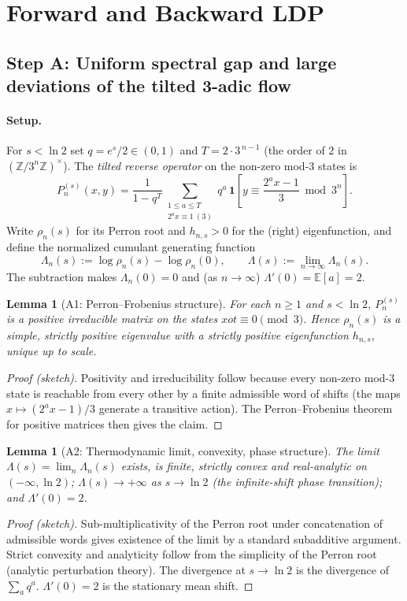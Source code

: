 \documentclass[12pt,a4paper]{article}
\newtheorem{lemma}[theorem]{Lemma}
\theoremstyle{remark}
\begin{document}
\section{Forward and Backward LDP}
\subsection{Step A: Uniform spectral gap and large deviations of the tilted 3-adic flow}
\label{subsec:step_a}
\paragraph{Setup.} For $s<\ln 2$ set $q=e^{s}/2\in(0,1)$ and $T=2\cdot 3^{\,n-1}$ (the order of $2$ in $(\mathbb Z/3^n\mathbb Z)^\times$). The \emph{tilted reverse operator} on the non-zero mod-$3$ states is
\[
P_n^{(s)}(x,y)=\frac{1}{1-q^{T}}\sum_{\substack{1\le a\le T\\ 2^{a}x\equiv1\ (3)}} q^{a}\,
\mathbf 1\!\left[y\equiv\frac{2^{a}x-1}{3}\bmod 3^{n}\right].
\]
Write $\rho_n(s)$ for its Perron root and $h_{n,s}>0$ for the (right) eigenfunction, and define the normalized cumulant generating function
\[
\Lambda_n(s):=\log\rho_n(s)-\log\rho_n(0),\qquad \Lambda(s):=\lim_{n\to\infty}\Lambda_n(s).
\]
The subtraction makes $\Lambda_n(0)=0$ and (as $n\to\infty$) $\Lambda'(0)=\mathbb E[a]=2$.
\begin{lemma}[A1: Perron--Frobenius structure]
For each $n\ge1$ and $s<\ln2$, $P_n^{(s)}$ is a positive irreducible matrix on the states $x
ot\equiv0\pmod3$. Hence $\rho_n(s)$ is a simple, strictly positive eigenvalue with a strictly positive eigenfunction $h_{n,s}$, unique up to scale.
\end{lemma}
\begin{proof}[Proof (sketch)]
Positivity and irreducibility follow because every non-zero mod-$3$ state is reachable from every other by a finite admissible word of shifts (the maps $x\mapsto(2^ax-1)/3$ generate a transitive action). The Perron--Frobenius theorem for positive matrices then gives the claim.
\end{proof}
\begin{lemma}[A2: Thermodynamic limit, convexity, phase structure]
The limit $\Lambda(s)=\lim_n\Lambda_n(s)$ exists, is finite, strictly convex and real-analytic on $(-\infty,\ln2)$; $\Lambda(s)\to+\infty$ as $s\to\ln2$ (the infinite-shift phase transition); and $\Lambda'(0)=2$.
\end{lemma}
\begin{proof}[Proof (sketch)]
Sub-multiplicativity of the Perron root under concatenation of admissible words gives existence of the limit by a standard subadditive argument. Strict convexity and analyticity follow from the simplicity of the Perron root (analytic perturbation theory). The divergence at $s\to\ln2$ is the divergence of $\sum_a q^a$. $\Lambda'(0)=2$ is the stationary mean shift.
\end{proof}
\end{document}
